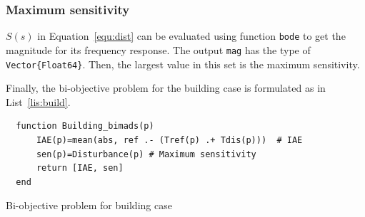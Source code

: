 \documentclass[11pt,oneside,onecolumn,openright]{article}
\begin{document}
  \subsubsection*{Maximum sensitivity}
  $S(s)$ in Equation~\eqref{equ:dist} can be evaluated using function \verb|bode| to get the magnitude for its frequency response. The output \verb|mag| has the type of \verb|Vector{Float64}|. Then, the largest value in this set is the maximum sensitivity.

    Finally, the bi-objective problem for the building case is formulated as in List~\ref{lis:build}.
        \begin{listing}[ht]
      \begin{verbatim}
  function Building_bimads(p)
      IAE(p)=mean(abs, ref .- (Tref(p) .+ Tdis(p)))  # IAE
      sen(p)=Disturbance(p) # Maximum sensitivity
      return [IAE, sen]
  end
    \end{verbatim}
  \cprotect\caption{Bi-objective problem for building case}
  \label{lis:build}
  \end{listing}
\end{document}
